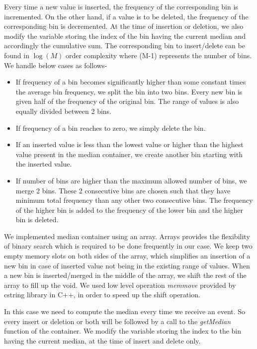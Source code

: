 Every time a new value is inserted, the frequency of the corresponding bin is incremented.
On the other hand, if a value is to be deleted, the frequency of the corresponding bin is decremented.
At the time of insertion or deletion, we also modify the variable storing the index of the bin having the current median and accordingly the cumulative sum.
The corresponding bin to insert/delete can be found in $\log(M)$ order complexity where (M-1) represents the number of bins.
We handle below cases as follows-
\begin{itemize}
\item If frequency of a bin becomes significantly higher than some constant times the average bin frequency, we split the bin into two bins.
Every new bin is given half of the frequency of the original bin.
The range of values is also equally divided between 2 bins.
\item If frequency of a bin reaches to zero, we simply delete the bin.
\item If an inserted value is less than the lowest value or higher than the highest value present in the median container, we create another bin starting with the inserted value.
\item If number of bins are higher than the maximum allowed number of bins, we merge 2 bins.
These 2 consecutive bins are chosen such that they have minimum total frequency than any other two consecutive bins.
The frequency of the higher bin is added to the frequency of the lower bin and the higher bin is deleted.
\end{itemize}

We implemented median container using an array.
Arrays provides the flexibility of binary search which is required to be done frequently in our case.
We keep two empty memory slots on both sides of the array, which simplifies an insertion of a new bin in case of inserted value not being in the existing range of values.
When a new bin is inserted/merged in the middle of the array, we shift the rest of the array to fill up the void.
We used low level operation \textit{memmove} provided by cstring library in C++, in order to speed up the shift operation.

In this case we need to compute the median every time we receive an event.
So every insert or deletion or both will be followed by a call to the \textit{getMedian} function of the container.
We modify the variable storing the index to the bin having the current median, at the time of insert and delete only.

